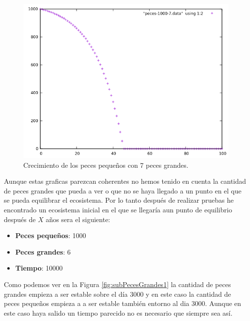 \documentclass[12pt,a4paper]{article}
\begin{document}
\begin{figure}[H]
	\centering
	\includegraphics{images/peces-1000-7.png}
	\caption{Crecimiento de los peces pequeños con 7 peces grandes.}
	\label{fig:peces2}
\end{figure}
Aunque estas graficas parezcan coherentes no hemos tenido en cuenta la cantidad de peces grandes que pueda a ver o que no se haya llegado a un punto en el que se pueda equilibrar el ecosistema. Por lo tanto después de realizar pruebas he encontrado un ecosistema inicial en el que se llegaría aun punto de equilibrio después de $X$ años sera el siguiente:
\begin{itemize}
	\item \textbf{Peces pequeños}: 1000
	\item \textbf{Peces grandes}: 6
	\item \textbf{Tiempo}: 10000
\end{itemize}
Como podemos ver en la Figura \ref{fig:subPecesGrandes1} la cantidad de peces grandes empieza a ser estable sobre el día 3000 y en este caso la cantidad de peces pequeños empieza a a ser estable también entorno al dia 3000. Aunque en este caso haya salido un tiempo parecido no es necesario que siempre sea así.
\end{document}
